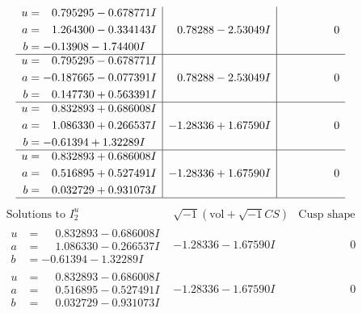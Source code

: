 \documentclass[1p]{elsarticle_modified}
\theoremstyle{definition}
\newcommand{\I}{\sqrt{-1}}
\begin{document}
$$\begin{array}{c|c|c}
\begin{aligned}
u &= \phantom{-}0.795295 - 0.678771 I \\
a &= \phantom{-}1.264300 - 0.334143 I \\
b &= -0.13908 - 1.74400 I\end{aligned}
 & \phantom{-}0.78288 - 2.53049 I & \phantom{-0.000000 } 0 \\ \hline\begin{aligned}
u &= \phantom{-}0.795295 - 0.678771 I \\
a &= -0.187665 - 0.077391 I \\
b &= \phantom{-}0.147730 + 0.563391 I\end{aligned}
 & \phantom{-}0.78288 - 2.53049 I & \phantom{-0.000000 } 0 \\ \hline\begin{aligned}
u &= \phantom{-}0.832893 + 0.686008 I \\
a &= \phantom{-}1.086330 + 0.266537 I \\
b &= -0.61394 + 1.32289 I\end{aligned}
 & -1.28336 + 1.67590 I & \phantom{-0.000000 } 0 \\ \hline\begin{aligned}
u &= \phantom{-}0.832893 + 0.686008 I \\
a &= \phantom{-}0.516895 + 0.527491 I \\
b &= \phantom{-}0.032729 + 0.931073 I\end{aligned}
 & -1.28336 + 1.67590 I & \phantom{-0.000000 } 0\\
 \hline 
 \end{array}$$\newpage$$\begin{array}{c|c|c}  
\text{Solutions to }I^u_{2}& \I (\text{vol} + \sqrt{-1}CS) & \text{Cusp shape}\\
 \hline 
\begin{aligned}
u &= \phantom{-}0.832893 - 0.686008 I \\
a &= \phantom{-}1.086330 - 0.266537 I \\
b &= -0.61394 - 1.32289 I\end{aligned}
 & -1.28336 - 1.67590 I & \phantom{-0.000000 } 0 \\ \hline\begin{aligned}
u &= \phantom{-}0.832893 - 0.686008 I \\
a &= \phantom{-}0.516895 - 0.527491 I \\
b &= \phantom{-}0.032729 - 0.931073 I\end{aligned}
 & -1.28336 - 1.67590 I & \phantom{-0.000000 } 0 \\ \hline\begin{aligned}

\end{aligned}
\end{array}$$
\end{document}
